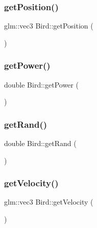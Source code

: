 \subsubsection{\texorpdfstring{get\+Position()}{getPosition()}}
{\footnotesize\ttfamily glm\+::vec3 Bird\+::get\+Position (\begin{DoxyParamCaption}{ }\end{DoxyParamCaption})}

\mbox{\label{classBird_a25cc8f4de5f1662fa56001531608fac9}} 
\subsubsection{\texorpdfstring{get\+Power()}{getPower()}}
{\footnotesize\ttfamily double Bird\+::get\+Power (\begin{DoxyParamCaption}{ }\end{DoxyParamCaption})}

\mbox{\label{classBird_a29d1ab4b40b2f9394f575019e3f8a247}} 
\subsubsection{\texorpdfstring{get\+Rand()}{getRand()}}
{\footnotesize\ttfamily double Bird\+::get\+Rand (\begin{DoxyParamCaption}{ }\end{DoxyParamCaption})}

\mbox{\label{classBird_ac2e4e44987731d67de77e2a18245024d}} 
\subsubsection{\texorpdfstring{get\+Velocity()}{getVelocity()}}
{\footnotesize\ttfamily glm\+::vec3 Bird\+::get\+Velocity (\begin{DoxyParamCaption}{ }\end{DoxyParamCaption})}

\mbox{\label{classBird_a7f02b8f1ed943dd812b483a6361d81e2}} 
